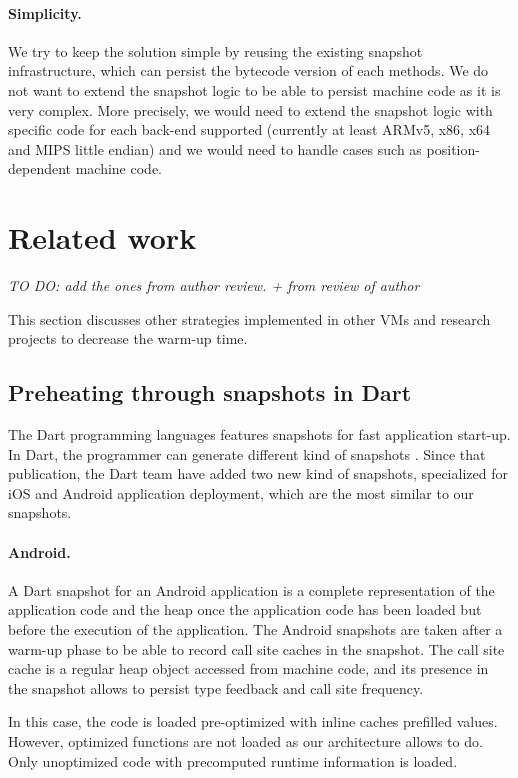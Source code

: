 \documentclass[a4paper,12pt,twoside]{../includes/ThesisStyle}
\begin{document}
\paragraph{Simplicity.}We try to keep the solution simple by reusing the existing snapshot infrastructure, which can persist the bytecode version of each methods. We do not want to extend the snapshot logic to be able to persist machine code as it is very complex. More precisely, we would need to extend the snapshot logic with specific code for each back-end supported (currently at least ARMv5, x86, x64 and MIPS little endian) and we would need to handle cases such as position-dependent machine code.


\section{Related work}
\label{sec:relWork}

\emph{TO DO: add the ones from author review.
+ from review of author}

This section discusses other strategies implemented in other VMs and research projects to decrease the warm-up time.

\subsection{Preheating through snapshots in Dart}

The Dart programming languages features snapshots for fast application start-up. In Dart, the programmer can generate different kind of snapshots \cite{Anna13a}. Since that publication, the Dart team have added two new kind of snapshots, specialized for iOS and Android application deployment, which are the most similar to our snapshots.

\paragraph{Android.} A Dart snapshot for an Android application is a complete representation of the application code and the heap once the application code has been loaded but before the execution of the application. The Android snapshots are taken after a warm-up phase to be able to record call site caches in the snapshot. The call site cache is a regular heap object accessed from machine code, and its presence in the snapshot allows to persist type feedback and call site frequency.

In this case, the code is loaded pre-optimized with inline caches prefilled values. However, optimized functions are not loaded as our architecture allows to do. Only unoptimized code with precomputed runtime information is loaded.
\end{document}
